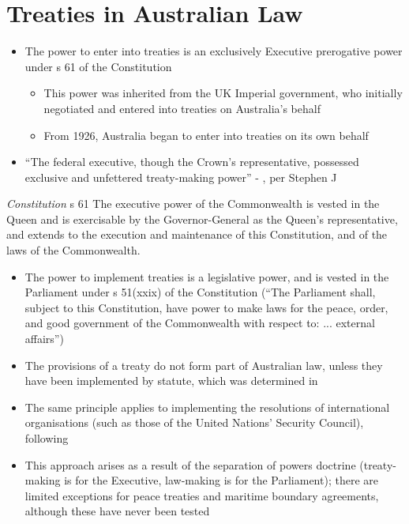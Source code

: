 \section{Treaties in Australian Law}
\begin{itemize}
    \item The power to enter into treaties is an exclusively Executive prerogative power under s 61 of the Constitution
    \begin{itemize}
        \item This power was inherited from the UK Imperial government, who initially negotiated and entered into treaties on Australia's behalf
        \item From 1926, Australia began to enter into treaties on its own behalf
    \end{itemize}
    \item ``The federal executive, though the Crown's representative, possessed exclusive and unfettered treaty-making power'' - , per Stephen J
\end{itemize}

\begin{statutedetails}{\textit{Constitution} s 61}\label{Constitution s 61}
    \flushleft
    The executive power of the Commonwealth is vested in the Queen and is exercisable by the Governor-General as the Queen's representative, and extends to the execution and maintenance of this Constitution, and of the laws of the Commonwealth.
\end{statutedetails}

\begin{itemize}
    \item The power to implement treaties is a legislative power, and is vested in the Parliament under s 51(xxix) of the Constitution (``The Parliament shall, subject to this Constitution, have power to make laws for the peace, order, and good government of the Commonwealth with respect to: ... external affairs'')
    \item The provisions of a treaty do not form part of Australian law, unless they have been implemented by statute, which was determined in 
    \item The same principle applies to implementing the resolutions of international organisations (such as those of the United Nations' Security Council), following 
    \item This approach arises as a result of the separation of powers doctrine (treaty-making is for the Executive, law-making is for the Parliament); there are limited exceptions for peace treaties and maritime boundary agreements, although these have never been tested
\end{itemize}

